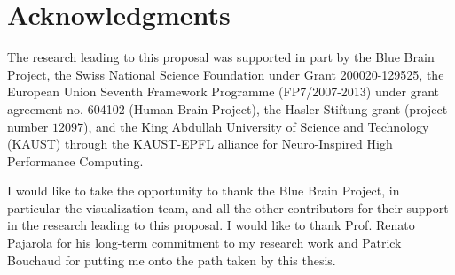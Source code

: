

\chapter*{Acknowledgments}
The research leading to this proposal was supported in part by the Blue Brain
Project, the Swiss National Science Foundation under Grant 200020-129525, the
European Union Seventh Framework Programme (FP7/2007-2013) under grant agreement
no. 604102 (Human Brain Project), the Hasler Stiftung grant (project number
$12097$), and the King Abdullah University of Science and Technology (KAUST)
through the KAUST-EPFL alliance for Neuro-Inspired High Performance Computing.

I would like to take the opportunity to thank the Blue Brain Project, in
particular the visualization team, and all the other contributors for their
support in the research leading to this proposal. I would like to thank Prof.
Renato Pajarola for his long-term commitment to my research work and Patrick
Bouchaud for putting me onto the path taken by this thesis.

